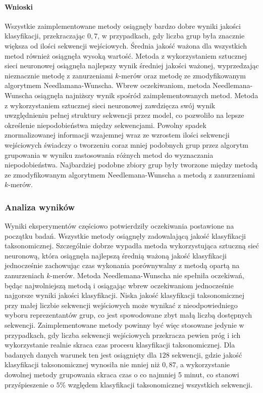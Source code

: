            \paragraph{Wnioski}
                Wszystkie zaimplementowane metody osiągnęły bardzo dobre wyniki jakości klasyfikacji, przekraczając $0,7$, w przypadkach, gdy liczba grup była znacznie większa od ilości sekwencji wejściowych. Średnia jakość ważona dla wszystkich metod również osiągnęła wysoką wartość.
                Metoda z wykorzystaniem sztucznej sieci neuronowej osiągnęła najlepszy wynik średniej jakości ważonej, wyprzedzając nieznacznie metodę z zanurzeniami $k$-merów oraz metodę ze zmodyfikowanym algorytmem Needlamana-Wunscha. Wbrew oczekiwaniom, metoda Needlemana-Wunscha osiągnęła najniższy wynik spośród zaimplementowanych metod.
                Metoda z wykorzystaniem sztucznej sieci neuronowej zawdzięcza swój wynik uwzględnieniu pełnej struktury sekwencji przez model, co pozwoliło na lepsze określenie niepodobieństwa między sekwencjami.
                Powolny spadek znormalizowanej informacji wzajemnej wraz ze wzrostem ilości sekwencji wejściowych świadczy o tworzeniu coraz mniej podobnych grup przez algorytm grupowania w wyniku zastosowania różnych metod do wyznaczania niepodobieństwa. Najbardziej podobne zbiory grup były tworzone między metodą ze zmodyfikowanym algorytmem Needlemana-Wunscha a metodą z zanurzeniami $k$-merów.

        \subsubsection{Analiza wyników}

            Wyniki eksperymentów częściowo potwierdziły oczekiwania postawione na początku badań. Wszystkie metody osiągnęły zadowalającą jakość klasyfikacji taksonomicznej. Szczególnie dobrze wypadła metoda wykorzystująca sztuczną sieć neuronową, która osiągnęła najlepszą średnią ważoną jakość klasyfikacji jednocześnie zachowując czas wykonania porównywalny z metodą opartą na zanurzeniach $k$-merów. Metoda Needlemana-Wunscha nie spełniła oczekiwań, będąc najwolniejszą metodą i osiągając wbrew oczekiwaniom jednocześnie najgorsze wyniki jakości klasyfikacji. Niska jakość klasyfikacji taksonomicznej przy małej liczbie sekwencji wejściowych może wynikać z nieodpowiedniego wyboru reprezentantów grup, co jest spowodowane zbyt małą liczbą dostępnych sekwencji. Zaimplementowane metody powinny być więc stosowane jedynie w przypadkach, gdy liczba sekwencji wejściowych przekracza pewien próg i ich wykorzystanie realnie skraca czas procesu klasyfikacji taksonomicznej. Dla badanych danych warunek ten jest osiągnięty dla $128$ sekwencji, gdzie jakość klasyfikacji taksonomicznej wynosiła nie mniej niż $0,87$, a wykorzystanie dowolnej metody grupowania skraca czas o co najmniej 5 minut, co stanowi przyśpieszenie o $5\%$ względem klasyfikacji taksonomicznej wszystkich sekwencji.
